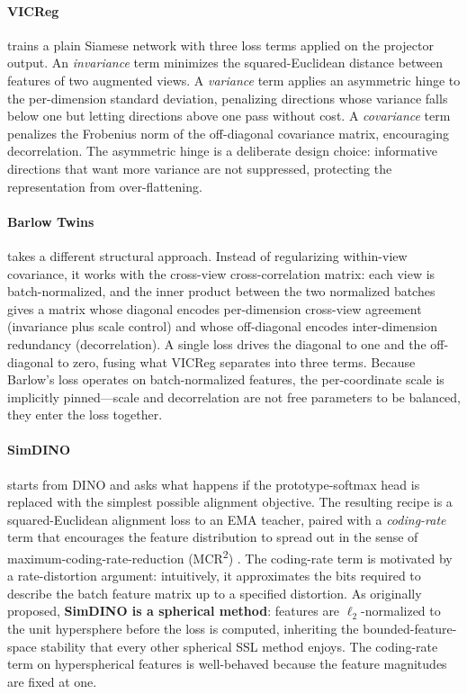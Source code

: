 \paragraph{VICReg} \citep{bardes2022vicreg} trains a plain Siamese network with three loss terms applied on the projector output. An \emph{invariance} term minimizes the squared-Euclidean distance between features of two augmented views. A \emph{variance} term applies an asymmetric hinge to the per-dimension standard deviation, penalizing directions whose variance falls below one but letting directions above one pass without cost. A \emph{covariance} term penalizes the Frobenius norm of the off-diagonal covariance matrix, encouraging decorrelation. The asymmetric hinge is a deliberate design choice: informative directions that want more variance are not suppressed, protecting the representation from over-flattening.

\paragraph{Barlow Twins} \citep{zbontar2021barlow} takes a different structural approach. Instead of regularizing within-view covariance, it works with the cross-view cross-correlation matrix: each view is batch-normalized, and the inner product between the two normalized batches gives a matrix whose diagonal encodes per-dimension cross-view agreement (invariance plus scale control) and whose off-diagonal encodes inter-dimension redundancy (decorrelation). A single loss drives the diagonal to one and the off-diagonal to zero, fusing what VICReg separates into three terms. Because Barlow's loss operates on batch-normalized features, the per-coordinate scale is implicitly pinned---scale and decorrelation are not free parameters to be balanced, they enter the loss together.

\paragraph{SimDINO} \citep{wu2025simdino} starts from DINO and asks what happens if the prototype-softmax head is replaced with the simplest possible alignment objective. The resulting recipe is a squared-Euclidean alignment loss to an EMA teacher, paired with a \emph{coding-rate} term that encourages the feature distribution to spread out in the sense of maximum-coding-rate-reduction (MCR\textsuperscript{2}) \citep{yu2020mcr2, ma2007segmentation}. The coding-rate term is motivated by a rate-distortion argument: intuitively, it approximates the bits required to describe the batch feature matrix up to a specified distortion. As originally proposed, \textbf{SimDINO is a spherical method}: features are $\ell_2$-normalized to the unit hypersphere before the loss is computed, inheriting the bounded-feature-space stability that every other spherical SSL method enjoys. The coding-rate term on hyperspherical features is well-behaved because the feature magnitudes are fixed at one.


